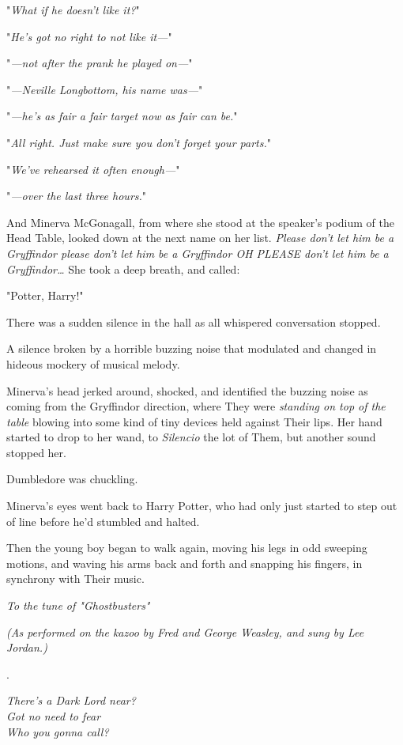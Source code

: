 "\emph{What if he doesn't like it?}"

"\emph{He's got no right to not like it---}"

"\emph{---not after the prank he played on---}"

"\emph{---Neville Longbottom, his name was---}"

"\emph{---he's as fair a fair target now as fair can be.}"

"\emph{All right. Just make sure you don't forget your parts.}"

"\emph{We've rehearsed it often enough---}"

"\emph{---over the last three hours.}"

And Minerva McGonagall, from where she stood at the speaker's podium of the
Head Table, looked down at the next name on her list. \emph{Please don't let
him be a Gryffindor please don't let him be a Gryffindor OH PLEASE don't let
him be a Gryffindor…} She took a deep breath, and called:

"Potter, Harry!"

There was a sudden silence in the hall as all whispered conversation stopped.

A silence broken by a horrible buzzing noise that modulated and changed in
hideous mockery of musical melody.

Minerva's head jerked around, shocked, and identified the buzzing noise as
coming from the Gryffindor direction, where They were \emph{standing on top of
the table} blowing into some kind of tiny devices held against Their lips. Her
hand started to drop to her wand, to \emph{Silencio} the lot of Them, but
another sound stopped her.

Dumbledore was chuckling.

Minerva's eyes went back to Harry Potter, who had only just started to step out
of line before he'd stumbled and halted.

Then the young boy began to walk again, moving his legs in odd sweeping
motions, and waving his arms back and forth and snapping his fingers, in
synchrony with Their music.

\begin{center}
\emph{To the tune of "Ghostbusters"}

\emph{(As performed on the kazoo by Fred and George Weasley,
and sung by Lee Jordan.)}

.

\emph{There's a Dark Lord near?\\
Got no need to fear\\
Who you gonna call?}
\end{center}

